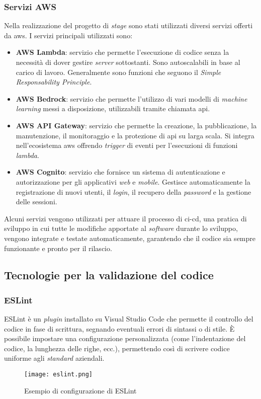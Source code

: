 \subsubsection {Servizi AWS}
Nella realizzazione del progetto di \textit{stage} sono stati utilizzati diversi servizi offerti da \gls{aws}. I servizi principali utilizzati sono:
\begin{itemize}
    \item \textbf{AWS Lambda}: servizio che permette l'esecuzione di codice senza la necessità di dover gestire \textit{server} sottostanti. Sono autoscalabili in base al carico di lavoro. Generalmente sono funzioni che seguono il \textit{Simple Responsability Principle}.
    \item \textbf{AWS Bedrock}: servizio che permette l'utilizzo di vari modelli di \textit{machine learning} messi a disposizione, utilizzabili tramite chiamata \gls{api}.
    \item \textbf{AWS API Gateway}: servizio che permette la creazione, la pubblicazione, la manutenzione, il monitoraggio e la protezione di \gls{api} su larga scala. Si integra nell'ecosistema \gls{aws} offrendo \textit{trigger} di eventi per l'esecuzioni di funzioni \textit{lambda}.
    \item \textbf{AWS Cognito}: servizio che fornisce un sistema di autenticazione e autorizzazione per gli applicativi \textit{web} e \textit{mobile}. Gestisce automaticamente la registrazione di nuovi utenti, il \textit{login}, il recupero della \textit{password} e la gestione delle sessioni.
\end{itemize}
Alcuni servizi vengono utilizzati per attuare il processo di \gls{ci-cd}, una pratica di sviluppo in cui tutte le modifiche apportate al \textit{software} durante lo sviluppo, vengono integrate e testate automaticamente, garantendo che il codice sia sempre funzionante e pronto per il rilascio.
\subsection{Tecnologie per la validazione del codice}
\subsubsection{ESLint}
ESLint è un \textit{plugin} installato su Visual Studio Code che permette il controllo del codice in fase di scrittura, segnando eventuali errori di sintassi o di stile.
È possibile impostare una configurazione personalizzata (come l'indentazione del codice, la lunghezza delle righe, ecc.), permettendo così di scrivere codice uniforme agli \textit{standard} aziendali.
\begin{figure}[H]
    \centering
    \texttt{[image: eslint.png]}
    \caption{Esempio di configurazione di ESLint}
    \label{fig:ESlint}
\end{figure} 
